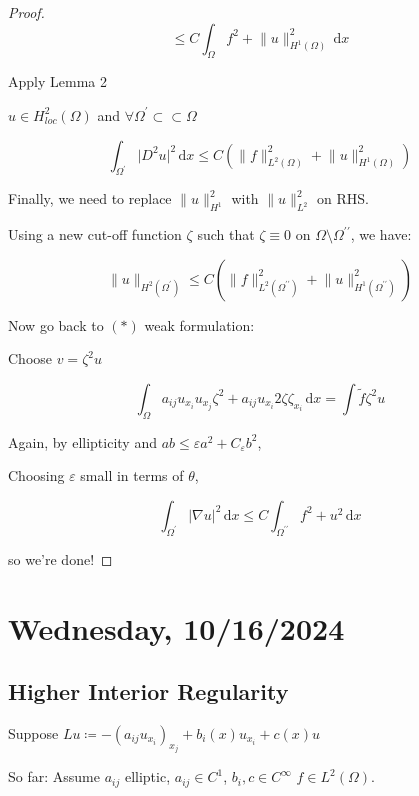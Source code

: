 \documentclass{article}
\theoremstyle{definition}
\begin{document}
\begin{proof}
\[
    \leq C \int_{\Omega} f^2 + \lVert u \rVert ^2 _ {H^1(\Omega)} \,\mathrm{d}x 
\]


Apply Lemma 2

\(u\in H^2_{loc} (\Omega)\) and \(\forall \Omega ^{\prime} \subset \subset \Omega\) 

\[
    \int_{\Omega^{\prime}} \vert D^2 u \vert ^ 2 \,\mathrm{d}x \leq  C \left( \lVert f \rVert ^ 2 _{L^2(\Omega)} + \lVert u \rVert ^ 2 _{H^1(\Omega)} \right) 
\]

Finally, we need to replace \(\lVert u \rVert ^2 _{H^1}\) with \(\lVert u \rVert ^2_{L^2}\) on RHS.

Using a new cut-off function \(\zeta\) such that \(\zeta \equiv 0\) on \(\Omega \setminus \Omega^{\prime\prime}\), we have:

\[
    \lVert u \rVert _{H^2(\Omega^{\prime})} \leq C \left( \lVert f \rVert ^ 2_{L^2(\Omega^{\prime\prime})} + \lVert u \rVert ^2 _{H^1(\Omega ^{\prime\prime} )} \right) 
\]

Now go back to \((\ast)\) weak formulation:

Choose \(v = \zeta ^2 u\)

\[
    \int_{\Omega} a_{ij} u_{x_i} u_{x_j} \zeta ^ 2 + a_{ij} u_{x_i} 2 \zeta \zeta_{x_i}  \,\mathrm{d}x = \int \tilde{f} \zeta^2 u
\]

Again, by ellipticity and \(ab \leq \varepsilon a ^ 2 + C_{\varepsilon} b^2\),

Choosing \(\varepsilon\) small in terms of \(\theta\),

\[
    \int_{\Omega^{\prime}} \vert \nabla u \vert ^ 2 \,\mathrm{d}x \leq C \int_{\Omega^{\prime\prime} } f^2 + u^2 \,\mathrm{d}x 
\]

so we're done!

\end{proof}

\section*{Wednesday, 10/16/2024}

\subsection*{Higher Interior Regularity}

Suppose \(Lu \coloneqq -(a_{ij} u_{x_i})_{x_j} + b_i(x) u_{x_i} + c(x) u\) 

So far: Assume \(a_{ij} \) elliptic, \(a_{ij} \in C^1\), \(b_i, c \in C^{\infty}\) \(f\in L^2(\Omega)\).
\end{document}

